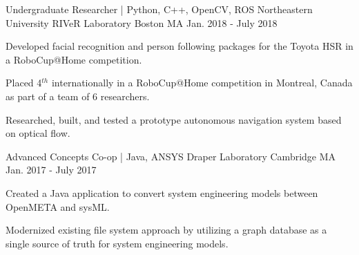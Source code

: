 \begin{cventries}
  \cventry
    {Undergraduate Researcher | Python, C++, OpenCV, ROS} %
    {Northeastern University RIVeR Laboratory} %
    {Boston MA} %
    {Jan. 2018 - July 2018} %
    {
      \begin{cvitems} %
        \item {Developed facial recognition and person following packages for the Toyota HSR in a RoboCup@Home competition.}
        \item {Placed 4$^{th}$ internationally in a RoboCup@Home competition in Montreal, Canada as part of a team of 6 researchers.}
        \item {Researched, built, and tested a prototype autonomous navigation system based on optical flow.}
      \end{cvitems}
    }

  \cventry
    {Advanced Concepts Co-op | Java, ANSYS} %
    {Draper Laboratory} %
    {Cambridge MA} %
    {Jan. 2017 - July 2017} %
    {
      \begin{cvitems} %
        \item {Created a Java application to convert system engineering models between OpenMETA and sysML.}
        \item {Modernized existing file system approach by utilizing a graph database as a single source of truth for system engineering models.}
      \end{cvitems}
    }

\end{cventries}
